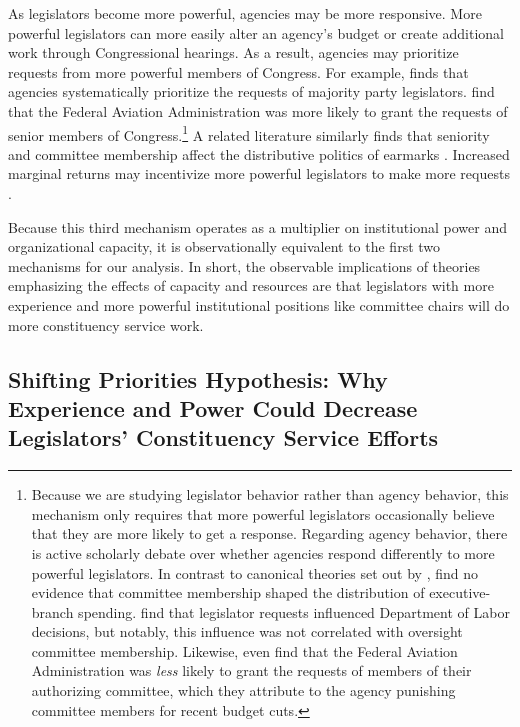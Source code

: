\documentclass[12pt]{article}
\begin{document}
As legislators become more powerful, agencies may be more responsive. More powerful legislators can more easily alter an agency's budget or create additional work through Congressional hearings. As a result, agencies may prioritize requests from more powerful members of Congress. For example, \citet{Lowande2018JOP} finds that agencies systematically prioritize the requests of majority party legislators.  \citet{MillsKalafHuges2015}  find that the Federal Aviation Administration was more likely to grant the requests of senior members of Congress.\footnote{Because we are studying legislator behavior rather than agency behavior, this mechanism only requires that more powerful legislators occasionally believe that they are more likely to get a response. Regarding agency behavior, there is active scholarly debate over whether agencies respond differently to more powerful legislators. In contrast to canonical theories set out by  \citet{Arnold1979},  \citet{BerryBurdenHowell09} find no evidence that committee membership shaped the distribution of executive-branch spending. \citet{RitchieYou2018} find that legislator requests influenced Department of Labor decisions, but notably, this influence was not correlated with oversight committee membership. Likewise,  \citet{MillsKalafHuges2015} even find that the Federal Aviation Administration was \emph{less} likely to grant the requests of members of their authorizing committee, which they attribute to the agency punishing committee members for recent budget cuts.}
A related literature similarly finds that seniority and committee membership affect the distributive politics of earmarks \citep{Lazarus2010}.
Increased marginal returns may incentivize more powerful legislators to make more requests \citep{CainFerejohnFiorina1987}. 

Because this third mechanism operates as a multiplier on institutional power and organizational capacity, it is observationally equivalent to the first two mechanisms for our analysis.
In short, the observable implications of theories emphasizing the effects of capacity and resources are that legislators with more experience and more powerful institutional positions like committee chairs will do more constituency service work.


\subsection{Shifting Priorities Hypothesis: Why Experience and Power Could Decrease Legislators' Constituency Service Efforts}
\end{document}
